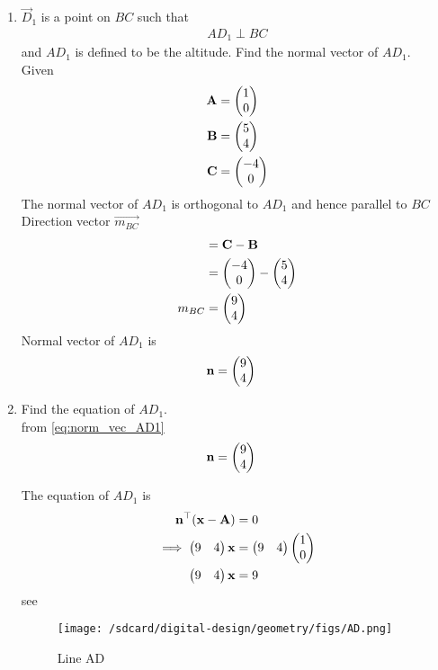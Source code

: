 \documentclass[11pt]{book}
\begin{document}
\begin{enumerate}[label=\thesection.\arabic*.,ref=\thesection.\theenumi]

\item $\vec{D}_1$ is a point on $BC$ such that
\begin{align}
AD_1 \perp BC
\end{align}
and $AD_1$ is defined to be the altitude. Find the normal vector of $AD_1$.
  \\   \solution Given  \\
  \begin{align} 
 \mathbf{A} &= \begin{pmatrix} 1\\ 0 \end{pmatrix} \\
 \mathbf{B} &= \begin{pmatrix} 5\\ 4 \end{pmatrix}\\
 \mathbf{C} &= \begin{pmatrix} -4\\ 0\end{pmatrix}
 \end{align}
The normal vector of $AD_{1}$ is orthogonal to $AD_1$ and hence parallel to $BC$ \\ Direction vector $\vec{m_{BC}}$ 
\begin{align}
    &=\mathbf{C}-\mathbf{B}\\
    &=\begin{pmatrix}-4 \\ 0\end{pmatrix} -\begin{pmatrix}5 \\4\end{pmatrix} \\
    m_{BC} &= \begin{pmatrix}9 \\ 4\end{pmatrix}
\end{align}
Normal vector of $AD_1$ is
\begin{align}
\label{eq:norm_vec_AD1}
	\vec{n} &= 
\myvec{9\\4}
\end{align}

\item Find the equation of $AD_1$.
 \\    \solution from \eqref{eq:norm_vec_AD1} 
 \begin{align}
	\mathbf{n} &= 
\begin{pmatrix}9\\4\end{pmatrix}
\end{align}

The equation of $AD_1$ is
\begin{align}
 \mathbf{n}^{\top}(\mathbf{x-A}) &= 0 \\
\implies \begin{pmatrix}9 & 4\end{pmatrix}\mathbf{x} &= \begin{pmatrix}9& 4\end{pmatrix}\begin{pmatrix}1 \\ 0\end{pmatrix}\\
\begin{pmatrix}9 & 4\end{pmatrix}\mathbf{x} &= 9
\end{align}
see 
\begin{figure}[H]
    \centering
    \texttt{[image: /sdcard/digital-design/geometry/figs/AD.png]}
    \caption{Line AD}
    \label{fig:line_ad}
\end{figure}
 

\end{enumerate}
\end{document}
